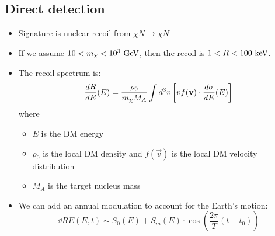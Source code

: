 \subsection{Direct detection}
\begin{itemize}
  \item Signature is nuclear recoil from $\chi N \rightarrow \chi N$
  \item If we assume $10 < m_\chi < 10^3~\text{GeV}$, then the recoil is $1 < R < 100~\text{keV}$. 
  \item The recoil spectrum is:
  \begin{equation}
    \dfrac{d R}{d E}(E) = \frac{\rho_0}{m_\chi M_A} \int d^3 v \left[v f(\mathbf{v}) \cdot \dfrac{d \sigma}{d E}(E)\right]
  \end{equation}
  where
  \begin{itemize}
    \item $E$ is the DM energy
    \item $\rho_0$ is the local DM density and $f(\vec v)$ is the local DM velocity distribution
    \item $M_A$ is the target nucleus mass
  \end{itemize}
  \item We can add an annual modulation to account for the Earth's motion:
  \begin{equation}
    \dd{R}{E}(E,t) \sim S_0(E) + S_m(E)\cdot \cos \left(\frac{2\pi}{T}(t-t_0)\right)
  \end{equation}
\end{itemize}

